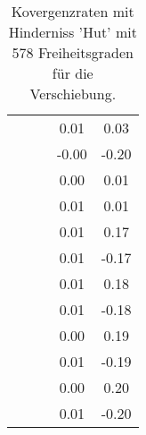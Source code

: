 \begin{table}
\begin{tabular}{c|cc|cc|}
\multicolumn{1}{|c|}{} & \multicolumn{1}{|c|}{} & \multicolumn{1}{|c|}{} & \multicolumn{1}{|c|}{      0.01} & \multicolumn{1}{|c|}{      0.03} \\ 
\multicolumn{1}{|c|}{} & \multicolumn{1}{|c|}{} & \multicolumn{1}{|c|}{} & \multicolumn{1}{|c|}{     -0.00} & \multicolumn{1}{|c|}{     -0.20} \\ 
\multicolumn{1}{|c|}{} & \multicolumn{1}{|c|}{} & \multicolumn{1}{|c|}{} & \multicolumn{1}{|c|}{      0.00} & \multicolumn{1}{|c|}{      0.01} \\ 
\multicolumn{1}{|c|}{} & \multicolumn{1}{|c|}{} & \multicolumn{1}{|c|}{} & \multicolumn{1}{|c|}{      0.01} & \multicolumn{1}{|c|}{      0.01} \\ 
\multicolumn{1}{|c|}{} & \multicolumn{1}{|c|}{} & \multicolumn{1}{|c|}{} & \multicolumn{1}{|c|}{      0.01} & \multicolumn{1}{|c|}{      0.17} \\ 
\multicolumn{1}{|c|}{} & \multicolumn{1}{|c|}{} & \multicolumn{1}{|c|}{} & \multicolumn{1}{|c|}{      0.01} & \multicolumn{1}{|c|}{     -0.17} \\ 
\multicolumn{1}{|c|}{} & \multicolumn{1}{|c|}{} & \multicolumn{1}{|c|}{} & \multicolumn{1}{|c|}{      0.01} & \multicolumn{1}{|c|}{      0.18} \\ 
\multicolumn{1}{|c|}{} & \multicolumn{1}{|c|}{} & \multicolumn{1}{|c|}{} & \multicolumn{1}{|c|}{      0.01} & \multicolumn{1}{|c|}{     -0.18} \\ 
\multicolumn{1}{|c|}{} & \multicolumn{1}{|c|}{} & \multicolumn{1}{|c|}{} & \multicolumn{1}{|c|}{      0.00} & \multicolumn{1}{|c|}{      0.19} \\ 
\multicolumn{1}{|c|}{} & \multicolumn{1}{|c|}{} & \multicolumn{1}{|c|}{} & \multicolumn{1}{|c|}{      0.01} & \multicolumn{1}{|c|}{     -0.19} \\ 
\multicolumn{1}{|c|}{} & \multicolumn{1}{|c|}{} & \multicolumn{1}{|c|}{} & \multicolumn{1}{|c|}{      0.00} & \multicolumn{1}{|c|}{      0.20} \\ 
\multicolumn{1}{|c|}{} & \multicolumn{1}{|c|}{} & \multicolumn{1}{|c|}{} & \multicolumn{1}{|c|}{      0.01} & \multicolumn{1}{|c|}{     -0.20} \\ 
\hline 
\end{tabular}\caption{Kovergenzraten mit Hinderniss 'Hut' mit 578 Freiheitsgraden für die Verschiebung.}\label{tab:Rate_Hut_level3}
\end{table} 
